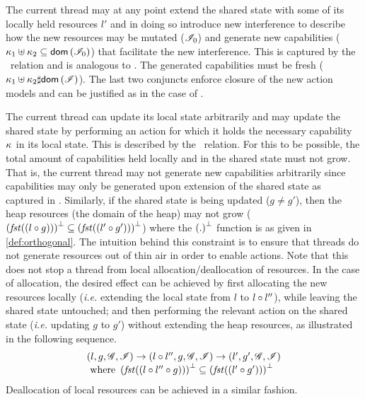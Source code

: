 %
%
The current thread may at any point extend the shared state with some of its locally held resources $l'$ and in doing so introduce new interference to describe how the new resources may be mutated ($\mathscr{I}_0$) and generate  new capabilities ($\kappa_{1} \uplus \kappa_{2} \subseteq \textsf{dom}\left( \mathscr{I}_0 \right)$) that facilitate the new interference. This is captured by the \extendG\ relation and is analogous to \extendR.  The generated capabilities must be fresh ($\kappa_{1} \uplus \kappa_{2}  \sharp \textsf{dom}\left( \mathscr{I} \right)$). The last two conjuncts  enforce closure of the new action models and can be justified as in the case of \extendR.

The current thread can update its local state arbitrarily and may update the shared state by performing an action for which it holds the necessary capability $\kappa_{}$ in its local state. This is described by the \updateG\ relation. For this to be possible, the total amount of capabilities held locally and in the shared state must not grow. That is, the current thread may not generate new capabilities arbitrarily since capabilities may only be generated upon extension of the shared state as captured in \extendG. Similarly, if the shared state is being updated ($g \not= g'$),  then the heap resources (the domain of the heap) may not grow ($\left(\mathit{fst}((l \circ g))\right)^{\bot} \subseteq \left(\mathit{fst}((l' \circ g'))\right)^{\bot}$) where the $\left(.\right)^{\bot}$ function is as given in \ref{def:orthogonal}. The intuition behind this constraint is to ensure that threads do not generate resources out of thin air in order to enable actions. Note that this does not stop a thread from local allocation/deallocation of resources. In the case of allocation, the desired effect can be achieved by first allocating the new resources locally (\textit{i.e.} extending the local state from $l$ to $l \circ l''$), while leaving the shared state untouched; and then performing the relevant action on the shared state (\textit{i.e.} updating $g$ to $g'$) without extending the heap resources, as illustrated in the following sequence.
%
\[
\begin{array}{l}
	(l, g, \mathscr{G}, \mathscr{I}) \rightarrow (l \circ l'', g, \mathscr{G}, \mathscr{I}) \rightarrow (l', g', \mathscr{G}, \mathscr{I})\\
	\text{ where } \left(\mathit{fst}((l \circ l'' \circ g))\right)^{\bot} \subseteq \left(\mathit{fst}((l' \circ g'))\right)^{\bot}
\end{array}
\]
%
Deallocation of local resources can be achieved in a similar fashion.

